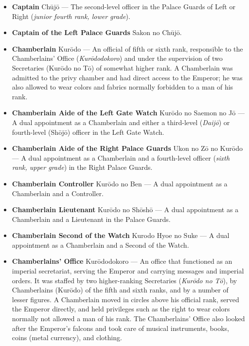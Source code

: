\documentclass{article}
\begin{document}
\begin{multicols}{2}
\begin{small}
\begin{itemize}[
				label=,
				leftmargin=0em,
				rightmargin=-1.5em,
				itemindent=-2em,
			]
			\item \textbf{Captain} Chūjō --- The second-level officer in the Palace Guards of Left or Right (\textit{junior fourth rank, lower grade}).

			\item \textbf{Captain of the Left Palace Guards} Sakon no Chūjō.

			\item \textbf{Chamberlain} Kurōdo --- An official of fifth or sixth rank, responsible to the Chamberlains' Office (\textit{Kurōdodokoro}) and under the supervision of two Secretaries (Kurōdo no Tō) of somewhat higher rank. A Chamberlain was admitted to the privy chamber and had direct access to the Emperor; he was also allowed to wear colors and fabrics normally forbidden to a man of his rank.

			\item \textbf{Chamberlain Aide of the Left Gate Watch} Kurōdo no Saemon no Jō --- A dual appointment as a Chamberlain and either a third-level (\textit{Daijō}) or fourth-level (Shōjō) officer in the Left Gate Watch.

			\item \textbf{Chamberlain Aide of the Right Palace Guards} Ukon no Zō no Kurōdo --- A dual appointment as a Chamberlain and a fourth-level officer (\textit{sixth rank, upper grade}) in the Right Palace Guards.

			\item \textbf{Chamberlain Controller} Kurōdo no Ben --- A dual appointment as a Chamberlain and a Controller.

			\item \textbf{Chamberlain Lieutenant} Kurōdo no Shōshō --- A dual appointment as a Chamberlain and a Lieutenant in the Palace Guards.

			\item \textbf{Chamberlain Second of the Watch} Kurodo Hyoe no Suke --- A dual appointment as a Chamberlain and a Second of the Watch.

			\item \textbf{Chamberlains' Office} Kurōdodokoro --- An office that functioned as an imperial secretariat, serving the Emperor and carrying messages and imperial orders. It was staffed by two higher-ranking Secretaries (\textit{Kurōdo no Tō}), by Chamberlains (Kurōdo) of the fifth and sixth ranks, and by a number of lesser figures. A Chamberlain moved in circles above his official rank, served the Emperor directly, and held privileges such as the right to wear colors normally not allowed a man of his rank. The Chamberlains' Office also looked after the Emperor's falcons and took care of musical instruments, books, coins (metal currency), and clothing.


\end{itemize}
\end{small}
\end{multicols}
\end{document}
